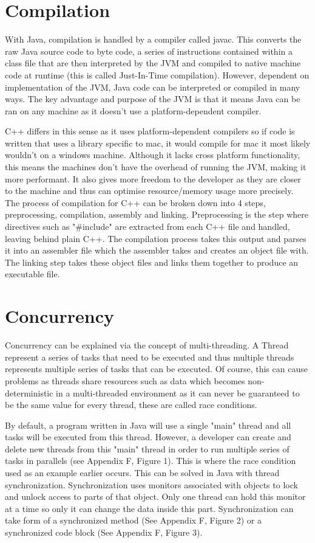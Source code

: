 \documentclass[]{report}
\begin{document}
\section{Compilation}
With Java, compilation is handled by a compiler called javac. This converts the raw Java source code to byte code, a series of instructions contained within a class file that are then interpreted by the JVM and compiled to native machine code at runtime (this is called Just-In-Time compilation). However, dependent on implementation of the JVM, Java code can be interpreted or compiled in many ways. The key advantage and purpose of the JVM is that it means Java can be ran on any machine as it doesn't use a platform-dependent compiler. \cite{Compilation}

C++ differs in this sense as it uses platform-dependent compilers so if code is written that uses a library specific to mac, it would compile for mac it most likely wouldn't on a windows machine. Although it lacks cross platform functionality, this means the machines don't have the overhead of running the JVM, making it more performant. It also gives more freedom to the developer as they are closer to the machine and thus can optimise resource/memory usage more precisely. The process of compilation for C++ can be broken down into 4 steps, preprocessing, compilation, assembly and linking. Preprocessing is the step where directives such as "\#include" are extracted from each C++ file and handled, leaving behind plain C++. The compilation process takes this output and parses it into an assembler file which the assembler takes and creates an object file with. The linking step takes these object files and links them together to produce an executable file. \cite{Compilation}

\section{Concurrency}
Concurrency can be explained via the concept of multi-threading. A Thread represent a series of tasks that need to be executed and thus multiple threads represents multiple series of tasks that can be executed.  Of course, this can cause problems as threads share resources such as data which becomes non-deterministic in a multi-threaded environment as it can never be guaranteed to be the same value for every thread, these are called race conditions.

By default, a program written in Java will use a single "main" thread and all tasks will be executed from this thread. However, a developer can create and delete new threads from this "main" thread in order to run multiple series of tasks in parallels (see Appendix F, Figure 1). This is where the race condition used as an example earlier occurs. This can be solved in Java with thread synchronization. Synchronization uses monitors associated with objects to lock and unlock access to parts of that object. Only one thread can hold this monitor at a time so only it can change the data inside this part. Synchronization can take form of a synchronized method (See Appendix F, Figure 2) or a synchronized code block (See Appendix F, Figure 3).\cite{ConcurrencyJava}
\end{document}
